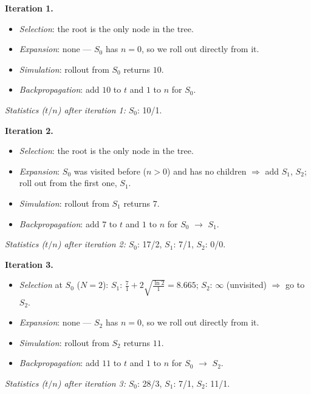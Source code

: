 \documentclass[11pt,a4paper]{article}
\begin{document}
\begin{solbox}
\textbf{Iteration 1.}
\begin{itemize}[leftmargin=1.5em,itemsep=1pt]
\item \emph{Selection}: the root is the only node in the tree.
\item \emph{Expansion}: none --- \textbf{$S_{0}$} has $n=0$, so we roll out directly from it.
\item \emph{Simulation}: rollout from $S_{0}$ returns $10$.
\item \emph{Backpropagation}: add $10$ to $t$ and $1$ to $n$ for $S_{0}$.
\end{itemize}
\textit{Statistics ($t/n$) after iteration 1:} $S_{0}$: 10/1.

\smallskip
\textbf{Iteration 2.}
\begin{itemize}[leftmargin=1.5em,itemsep=1pt]
\item \emph{Selection}: the root is the only node in the tree.
\item \emph{Expansion}: $S_{0}$ was visited before ($n>0$) and has no children $\Rightarrow$ add $S_{1}$, $S_{2}$; roll out from the first one, \textbf{$S_{1}$}.
\item \emph{Simulation}: rollout from $S_{1}$ returns $7$.
\item \emph{Backpropagation}: add $7$ to $t$ and $1$ to $n$ for $S_{0}$ $\to$ $S_{1}$.
\end{itemize}
\textit{Statistics ($t/n$) after iteration 2:} $S_{0}$: 17/2, $S_{1}$: 7/1, $S_{2}$: 0/0.

\smallskip
\textbf{Iteration 3.}
\begin{itemize}[leftmargin=1.5em,itemsep=1pt]
\item \emph{Selection} at $S_{0}$ ($N=2$): $S_{1}$: $\frac{7}{1} + 2\sqrt{\frac{\ln 2}{1}} = 8.665$; $S_{2}$: $\infty$ (unvisited) $\Rightarrow$ go to \textbf{$S_{2}$}.
\item \emph{Expansion}: none --- \textbf{$S_{2}$} has $n=0$, so we roll out directly from it.
\item \emph{Simulation}: rollout from $S_{2}$ returns $11$.
\item \emph{Backpropagation}: add $11$ to $t$ and $1$ to $n$ for $S_{0}$ $\to$ $S_{2}$.
\end{itemize}
\textit{Statistics ($t/n$) after iteration 3:} $S_{0}$: 28/3, $S_{1}$: 7/1, $S_{2}$: 11/1.


\end{solbox}
\end{document}
